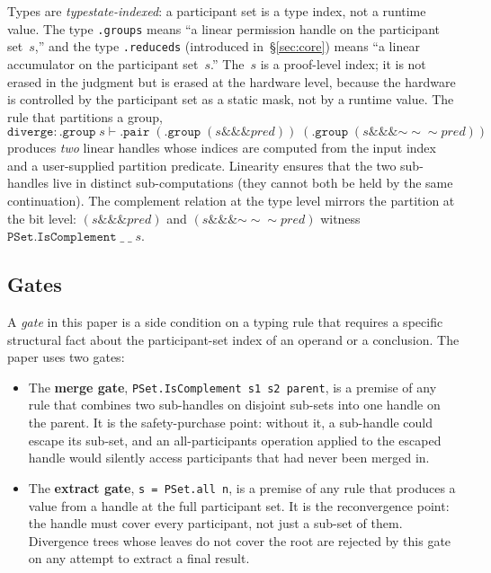 \documentclass[acmsmall,screen,review,anonymous,nonacm]{acmart}
\begin{document}
Types are \emph{typestate-indexed}: a participant set is a type index, not a runtime value. The type \texttt{.group\;s} means ``a linear permission handle on the participant set~$s$,'' and the type \texttt{.reduced\;s} (introduced in~\S\ref{sec:core}) means ``a linear accumulator on the participant set~$s$.'' The~$s$ is a proof-level index; it is not erased in the judgment but is erased at the hardware level, because the hardware is controlled by the participant set as a static mask, not by a runtime value. The rule that partitions a group,
\[
  \texttt{diverge} : \texttt{.group}\;s \vdash \texttt{.pair}\;(\texttt{.group}\;(s \mathbin{\&\&\&} \mathit{pred}))\;(\texttt{.group}\;(s \mathbin{\&\&\&} {\mathord{\sim\!\sim\!\sim}\mathit{pred}}))
\]
produces \emph{two} linear handles whose indices are computed from the input index and a user-supplied partition predicate. Linearity ensures that the two sub-handles live in distinct sub-computations (they cannot both be held by the same continuation). The complement relation at the type level mirrors the partition at the bit level: $(s \mathbin{\&\&\&} \mathit{pred})$ and $(s \mathbin{\&\&\&} {\mathord{\sim\!\sim\!\sim}\mathit{pred}})$ witness $\texttt{PSet.IsComplement}\;\_\;\_\;s$.

\subsection{Gates}\label{sec:gates}

A \emph{gate} in this paper is a side condition on a typing rule that requires a specific structural fact about the participant-set index of an operand or a conclusion. The paper uses two gates:

\begin{itemize}
  \item The \textbf{merge gate}, \texttt{PSet.IsComplement s1 s2 parent}, is a premise of any rule that combines two sub-handles on disjoint sub-sets into one handle on the parent. It is the safety-purchase point: without it, a sub-handle could escape its sub-set, and an all-participants operation applied to the escaped handle would silently access participants that had never been merged in.

  \item The \textbf{extract gate}, \texttt{s = PSet.all n}, is a premise of any rule that produces a value from a handle at the full participant set. It is the reconvergence point: the handle must cover every participant, not just a sub-set of them. Divergence trees whose leaves do not cover the root are rejected by this gate on any attempt to extract a final result.
\end{itemize}
\end{document}
